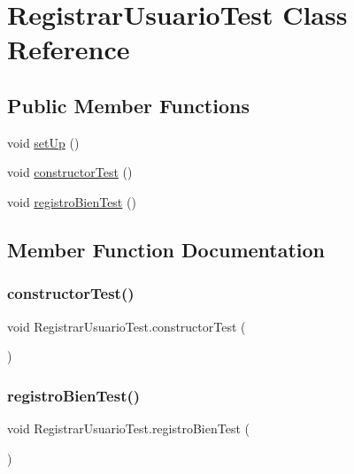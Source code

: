 \hypertarget{class_registrar_usuario_test}{}\section{Registrar\+Usuario\+Test Class Reference}
\label{class_registrar_usuario_test}
\subsection*{Public Member Functions}
\begin{DoxyCompactItemize}
\item 
void \mbox{\hyperlink{class_registrar_usuario_test_a9ca8f19c0a72efcfb1e8dd2423a4c7f8}{set\+Up}} ()
\item 
void \mbox{\hyperlink{class_registrar_usuario_test_a642350c10bea88ff773d97582b403b08}{constructor\+Test}} ()
\item 
void \mbox{\hyperlink{class_registrar_usuario_test_a2d2394d5b07b0b51219c5a0ad5f37d9f}{registro\+Bien\+Test}} ()
\end{DoxyCompactItemize}


\subsection{Member Function Documentation}
\mbox{\label{class_registrar_usuario_test_a642350c10bea88ff773d97582b403b08}} 
\subsubsection{\texorpdfstring{constructorTest()}{constructorTest()}}
{\footnotesize\ttfamily void Registrar\+Usuario\+Test.\+constructor\+Test (\begin{DoxyParamCaption}{ }\end{DoxyParamCaption})}

\mbox{\label{class_registrar_usuario_test_a2d2394d5b07b0b51219c5a0ad5f37d9f}} 
\subsubsection{\texorpdfstring{registroBienTest()}{registroBienTest()}}
{\footnotesize\ttfamily void Registrar\+Usuario\+Test.\+registro\+Bien\+Test (\begin{DoxyParamCaption}{ }\end{DoxyParamCaption})}

